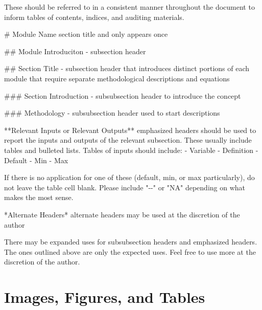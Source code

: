 \documentclass[
  letterpaper,
  oneside,
  openany]{scrbook}
\newenvironment{Shaded}{\begin{snugshade}}{\end{snugshade}}
\newcommand{\FunctionTok}[1]{\textcolor[rgb]{0.28,0.35,0.67}{#1}}
\newcommand{\NormalTok}[1]{\textcolor[rgb]{0.00,0.23,0.31}{#1}}
\newcommand{\SpecialStringTok}[1]{\textcolor[rgb]{0.13,0.47,0.30}{#1}}
\begin{document}
These should be referred to in a consistent manner throughout the
document to inform tables of contents, indices, and auditing materials.

\begin{Shaded}
\begin{Highlighting}[]
\FunctionTok{\# Module Name}
\NormalTok{section title and only appears once}

\FunctionTok{\#\# Module Introduciton}
\SpecialStringTok{{-} }\NormalTok{subsection header}

\FunctionTok{\#\# Section Title }
\SpecialStringTok{{-} }\NormalTok{subsection header that introduces distinct portions of each module that require separate methodological descriptions and equations}

\FunctionTok{\#\#\# Section Introduction }
\SpecialStringTok{{-} }\NormalTok{subsubsection header to introduce the concept}

\FunctionTok{\#\#\# Methodology }
\SpecialStringTok{{-} }\NormalTok{subsubsection header used to start descriptions}

\NormalTok{**Relevant Inputs or Relevant Outputs** }
\NormalTok{emphasized headers should be used to report the inputs and outputs of the relevant subsection. }
\NormalTok{These usually include tables and bulleted lists. Tables of inputs should include: }
\SpecialStringTok{{-} }\NormalTok{Variable}
\SpecialStringTok{{-} }\NormalTok{Definition}
\SpecialStringTok{{-} }\NormalTok{Default}
\SpecialStringTok{{-} }\NormalTok{Min}
\SpecialStringTok{{-} }\NormalTok{Max}

\NormalTok{If there is no application for one of these (default, min, or max particularly), }
\NormalTok{do not leave the table cell blank. Please include "{-}{-}" or "NA" depending on what makes the most sense. }

\NormalTok{*Alternate Headers* alternate headers may be used at the discretion of the author}
\end{Highlighting}
\end{Shaded}

There may be expanded uses for subsubsection headers and emphasized
headers. The ones outlined above are only the expected uses. Feel free
to use more at the discretion of the author.

\section{Images, Figures, and Tables}\label{images-figures-and-tables}
\end{document}
